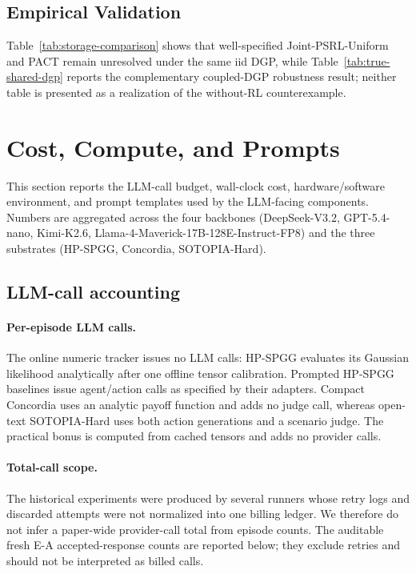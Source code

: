 \subsection{Empirical Validation}
\label{app:theory-empirical}
\label{sec:theory-sim}

Table~\ref{tab:storage-comparison} shows that well-specified Joint-PSRL-Uniform and PACT remain unresolved under the same iid DGP, while Table~\ref{tab:true-shared-dgp} reports the complementary coupled-DGP robustness result; neither table is presented as a realization of the without-RL counterexample.

\section{Cost, Compute, and Prompts}
\label{app:cost-compute}

This section reports the LLM-call budget, wall-clock cost, hardware/software environment, and prompt templates used by the LLM-facing components. Numbers are aggregated across the four backbones (DeepSeek-V3.2, GPT-5.4-nano, Kimi-K2.6, Llama-4-Maverick-17B-128E-Instruct-FP8) and the three substrates (HP-SPGG, Concordia, SOTOPIA-Hard).

\subsection{LLM-call accounting}
\label{app:cost-accounting}

\paragraph{Per-episode LLM calls.} The online numeric tracker issues no LLM calls: HP-SPGG evaluates its Gaussian likelihood analytically after one offline tensor calibration. Prompted HP-SPGG baselines issue agent/action calls as specified by their adapters. Compact Concordia uses an analytic payoff function and adds no judge call, whereas open-text SOTOPIA-Hard uses both action generations and a scenario judge. The practical bonus is computed from cached tensors and adds no provider calls.

\paragraph{Total-call scope.} The historical experiments were produced by several runners whose retry logs and discarded attempts were not normalized into one billing ledger. We therefore do not infer a paper-wide provider-call total from episode counts. The auditable fresh E-A accepted-response counts are reported below; they exclude retries and should not be interpreted as billed calls.

